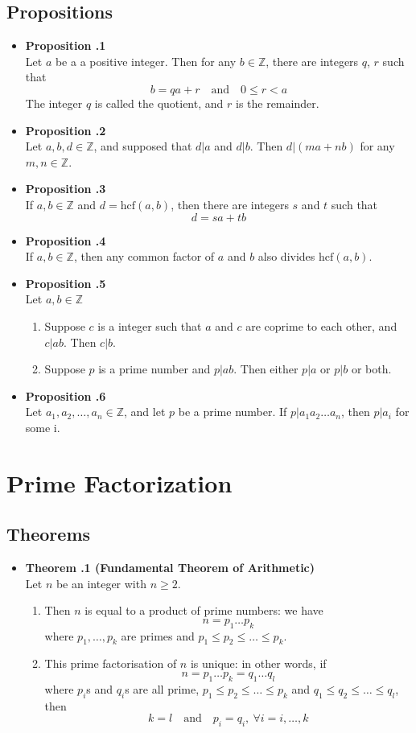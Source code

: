 \documentclass[a4paper,12pt]{article}
\newcommand{\prop}[1]{
    \item \textbf{Proposition \thesection.#1}\\
}
\newcommand{\theo}[1]{
    \item \textbf{Theorem \thesection.#1}\\
}
\begin{document}
\subsection{Propositions}
\begin{itemize}
    \prop 1
    Let $a$ be a a positive integer. Then for any $b \in \mathbb{Z}$, there are
    integers $q$, $r$ such that
        $$ b = qa + r\quad\text{and}\quad0 \le r < a $$
    The integer $q$ is called the quotient, and $r$ is the remainder.
    
    \prop 2
    Let $a, b, d \in \mathbb{Z}$, and supposed that $d|a$ and $d|b$. Then
    $d|(ma + nb)$ for any $m, n \in \mathbb{Z}$.
    
    \prop 3
    If $a, b \in \mathbb{Z}$ and $d = \text{hcf}(a, b)$, then there are
    integers $s$ and $t$ such that
        $$ d = sa + tb $$
        
    \prop 4
    If $a, b \in \mathbb{Z}$, then any common factor of $a$ and $b$ also
    divides $\text{hcf}(a, b)$.
    
    \prop 5
    Let $a, b \in \mathbb{Z}$
    \begin{enumerate}
        \item Suppose $c$ is a integer such that $a$ and $c$ are coprime to
        each other, and $c|ab$. Then $c|b$.
        \item Suppose $p$ is a prime number and $p|ab$. Then either $p|a$ or $p|b$ or both.
    \end{enumerate}
    
    \prop 6
    Let $a_1, a_2, \ldots, a_n \in \mathbb{Z}$, and let $p$ be a prime number.
    If $p|a_1a_2\ldots a_n$, then $p|a_i$ for some i.
\end{itemize}

\section{Prime Factorization}
\subsection{Theorems}
\begin{itemize}
\item \textbf{Theorem \thesection.1 (Fundamental Theorem of Arithmetic)}\\  %
Let $n$ be an integer with $n \ge 2$.
\begin{enumerate}
    \item Then $n$ is equal to a product of prime numbers: we have
        $$ n = p_1 \ldots p_k $$
    where $p_1, \ldots, p_k$ are primes and $p_1 \le p_2 \le \ldots \le p_k$.
    
    \item This prime factorisation of $n$ is unique: in other words, if
        $$ n = p_1 \ldots p_k = q_1 \ldots q_l $$
    where $p_i$s and $q_i$s are all prime, $p_1 \le p_2 \le \ldots \le p_k$ and $q_1 \le q_2 \le \ldots \le q_l$, then
        $$ k=l \quad \text{and} \quad p_i = q_i, \ \forall i = i,\ldots,k$$
\end{enumerate}
\end{itemize}
\end{document}
